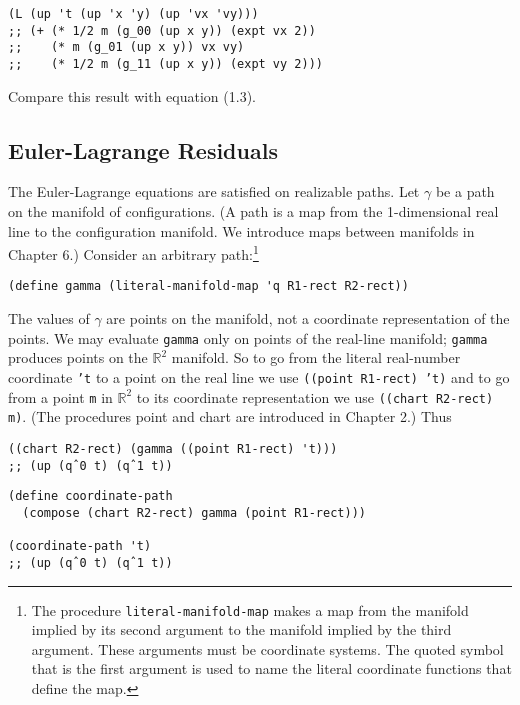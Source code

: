 \documentclass[11pt]{article}
\begin{document}
\begin{verbatim}
(L (up 't (up 'x 'y) (up 'vx 'vy)))
;; (+ (* 1/2 m (g_00 (up x y)) (expt vx 2))
;;    (* m (g_01 (up x y)) vx vy)
;;    (* 1/2 m (g_11 (up x y)) (expt vy 2)))
\end{verbatim}

Compare this result with equation (1.3).

\subsection{Euler-Lagrange Residuals}
\label{sec:org07b0395}

The Euler-Lagrange equations are satisfied on realizable paths. Let \(\gamma\)
be a path on the manifold of configurations. (A path is a map from the
1-dimensional real line to the configuration manifold. We introduce maps
between manifolds in Chapter 6.) Consider an arbitrary path:\footnote{The procedure \texttt{literal-manifold-map} makes a map from the manifold
implied by its second argument to the manifold implied by the third argument.
These arguments must be coordinate systems. The quoted symbol that is the first
argument is used to name the literal coordinate functions that define the map.}

\begin{verbatim}
(define gamma (literal-manifold-map 'q R1-rect R2-rect))
\end{verbatim}

The values of \(\gamma\) are points on the manifold, not a coordinate
representation of the points. We may evaluate \texttt{gamma} only on points of the
real-line manifold; \texttt{gamma} produces points on the \(\mathbb{R}^2\) manifold.
So to go from the literal real-number coordinate \texttt{'t} to a point on the real
line we use \texttt{((point R1-rect) 't)} and to go from a point \texttt{m} in
\(\mathbb{R}^2\) to its coordinate representation we use \texttt{((chart R2-rect) m)}.
(The procedures point and chart are introduced in Chapter 2.) Thus

\begin{verbatim}
((chart R2-rect) (gamma ((point R1-rect) 't)))
;; (up (qˆ0 t) (qˆ1 t))
\end{verbatim}

\begin{verbatim}
(define coordinate-path
  (compose (chart R2-rect) gamma (point R1-rect)))

(coordinate-path 't)
;; (up (qˆ0 t) (qˆ1 t))
\end{verbatim}
\end{document}
